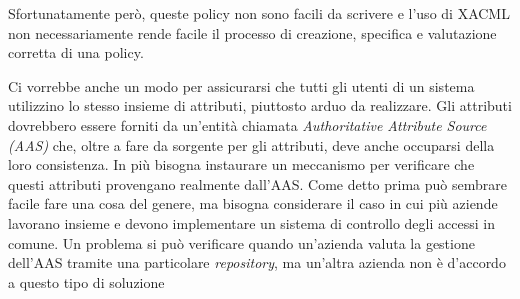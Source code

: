 Sfortunatamente però, queste policy non sono facili da scrivere e l’uso
di XACML non necessariamente rende facile il processo di creazione, specifica e valutazione corretta di una policy.\\ \par
Ci vorrebbe anche un modo per assicurarsi che tutti gli utenti di un sistema utilizzino lo stesso insieme di attributi, piuttosto arduo da realizzare. Gli attributi dovrebbero essere forniti da un’entità chiamata
\textit{Authoritative Attribute Source (AAS)} che, oltre a fare da sorgente per gli
attributi, deve anche occuparsi della loro consistenza. In più bisogna instaurare
un meccanismo per verificare che questi attributi provengano
realmente dall’AAS. Come detto prima può sembrare facile fare una cosa del genere, ma
bisogna considerare il caso in cui più aziende lavorano insieme e devono
implementare un sistema di controllo degli accessi in comune. Un problema
si può verificare quando un’azienda valuta la gestione dell’AAS
tramite una particolare \textit{repository}, ma un’altra azienda non è d’accordo a
questo tipo di soluzione


